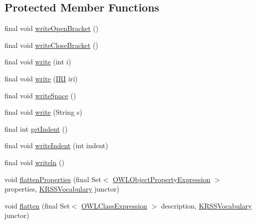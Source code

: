 \subsection*{Protected Member Functions}
\begin{DoxyCompactItemize}
\item 
final void \hyperlink{classde_1_1uulm_1_1ecs_1_1ai_1_1owlapi_1_1krssrenderer_1_1_k_r_s_s_object_renderer_a833fd7de51da1007c23f681da33f372c}{write\-Open\-Bracket} ()
\item 
final void \hyperlink{classde_1_1uulm_1_1ecs_1_1ai_1_1owlapi_1_1krssrenderer_1_1_k_r_s_s_object_renderer_a064badbdb5b5e499a4d271e54b7d68cf}{write\-Close\-Bracket} ()
\item 
final void \hyperlink{classde_1_1uulm_1_1ecs_1_1ai_1_1owlapi_1_1krssrenderer_1_1_k_r_s_s_object_renderer_abdcc7cd914302088415dce908f911975}{write} (int i)
\item 
final void \hyperlink{classde_1_1uulm_1_1ecs_1_1ai_1_1owlapi_1_1krssrenderer_1_1_k_r_s_s_object_renderer_ace66514248b884b816f7e7a871e883b2}{write} (\hyperlink{classorg_1_1semanticweb_1_1owlapi_1_1model_1_1_i_r_i}{I\-R\-I} iri)
\item 
final void \hyperlink{classde_1_1uulm_1_1ecs_1_1ai_1_1owlapi_1_1krssrenderer_1_1_k_r_s_s_object_renderer_a0f0ba942cfd37decc0dee7e6d028dde9}{write\-Space} ()
\item 
final void \hyperlink{classde_1_1uulm_1_1ecs_1_1ai_1_1owlapi_1_1krssrenderer_1_1_k_r_s_s_object_renderer_aa88217a7e154b54900b9b28654802a1e}{write} (String s)
\item 
final int \hyperlink{classde_1_1uulm_1_1ecs_1_1ai_1_1owlapi_1_1krssrenderer_1_1_k_r_s_s_object_renderer_a0242314a96259d2cfe0cb483dc6d3003}{get\-Indent} ()
\item 
final void \hyperlink{classde_1_1uulm_1_1ecs_1_1ai_1_1owlapi_1_1krssrenderer_1_1_k_r_s_s_object_renderer_afa6e2464114b684abd54cc5aee52b136}{write\-Indent} (int indent)
\item 
final void \hyperlink{classde_1_1uulm_1_1ecs_1_1ai_1_1owlapi_1_1krssrenderer_1_1_k_r_s_s_object_renderer_ab38458f42356d44f45c1909cb032c390}{writeln} ()
\item 
void \hyperlink{classde_1_1uulm_1_1ecs_1_1ai_1_1owlapi_1_1krssrenderer_1_1_k_r_s_s_object_renderer_a9a8ceacd8d729207bb8eac6fbc9baced}{flatten\-Properties} (final Set$<$ \hyperlink{interfaceorg_1_1semanticweb_1_1owlapi_1_1model_1_1_o_w_l_object_property_expression}{O\-W\-L\-Object\-Property\-Expression} $>$ properties, \hyperlink{enumde_1_1uulm_1_1ecs_1_1ai_1_1owlapi_1_1krssrenderer_1_1_k_r_s_s_vocabulary}{K\-R\-S\-S\-Vocabulary} junctor)
\item 
void \hyperlink{classde_1_1uulm_1_1ecs_1_1ai_1_1owlapi_1_1krssrenderer_1_1_k_r_s_s_object_renderer_aec530eed2f739b7effce820b5513332f}{flatten} (final Set$<$ \hyperlink{interfaceorg_1_1semanticweb_1_1owlapi_1_1model_1_1_o_w_l_class_expression}{O\-W\-L\-Class\-Expression} $>$ description, \hyperlink{enumde_1_1uulm_1_1ecs_1_1ai_1_1owlapi_1_1krssrenderer_1_1_k_r_s_s_vocabulary}{K\-R\-S\-S\-Vocabulary} junctor)
\end{DoxyCompactItemize}
